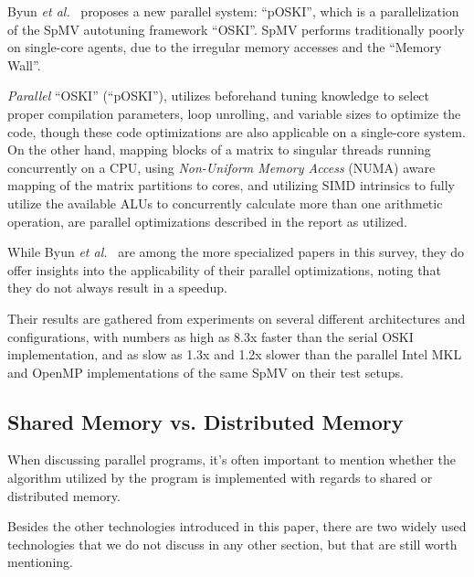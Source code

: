 Byun \textit{et al.}~\cite{Byun:EECS-2012-215} proposes a new parallel system: ``pOSKI'', which is a parallelization of the SpMV autotuning framework ``OSKI''.
SpMV performs traditionally poorly on single-core agents, due to the irregular memory accesses and the ``Memory Wall''.

\textit{Parallel} ``OSKI'' (``pOSKI''), utilizes beforehand tuning knowledge to select proper compilation parameters, loop unrolling, and variable sizes to optimize the code, though these code optimizations are also applicable on a single-core system.
On the other hand, mapping blocks of a matrix to singular threads running concurrently on a CPU, using \textit{Non-Uniform Memory Access} (NUMA) aware mapping of the matrix partitions to cores, and utilizing SIMD intrinsics to fully utilize the available ALUs to concurrently calculate more than one arithmetic operation, are parallel optimizations described in the report as utilized.

While Byun \textit{et al.}~\cite{Byun:EECS-2012-215} are among the more specialized papers in this survey, they do offer insights into the applicability of their parallel optimizations, noting that they do not always result in a speedup.

Their results are gathered from experiments on several different architectures and configurations, with numbers as high as 8.3x faster than the serial OSKI implementation, and as slow as 1.3x and 1.2x slower than the parallel Intel MKL and OpenMP implementations of the same SpMV on their test setups.

\subsection{Shared Memory vs. Distributed Memory}

When discussing parallel programs, it's often important to mention whether the algorithm utilized by the program is implemented with regards to shared or distributed memory.

Besides the other technologies introduced in this paper, there are two widely used technologies that we do not discuss in any other section, but that are still worth mentioning.

